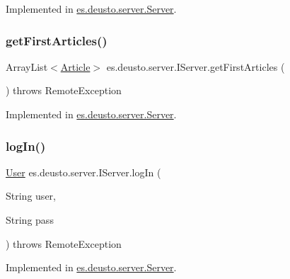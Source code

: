 Implemented in \hyperlink{classes_1_1deusto_1_1server_1_1_server_a2c4455392fb9fb404d425110b5905c6a}{es.\+deusto.\+server.\+Server}.

\mbox{\label{interfacees_1_1deusto_1_1server_1_1_i_server_a27b2a5526387404d63d7fc6d0415acd4}} 
\subsubsection{\texorpdfstring{get\+First\+Articles()}{getFirstArticles()}}
{\footnotesize\ttfamily Array\+List$<$\hyperlink{classes_1_1deusto_1_1server_1_1jdo_1_1_article}{Article}$>$ es.\+deusto.\+server.\+I\+Server.\+get\+First\+Articles (\begin{DoxyParamCaption}{ }\end{DoxyParamCaption}) throws Remote\+Exception}



Implemented in \hyperlink{classes_1_1deusto_1_1server_1_1_server_a64dfcee7821b0cc581367c1b21d9f97f}{es.\+deusto.\+server.\+Server}.

\mbox{\label{interfacees_1_1deusto_1_1server_1_1_i_server_ae6b27c8714c2e2eadc9a55bccb0543fc}} 
\subsubsection{\texorpdfstring{log\+In()}{logIn()}}
{\footnotesize\ttfamily \hyperlink{classes_1_1deusto_1_1server_1_1jdo_1_1_user}{User} es.\+deusto.\+server.\+I\+Server.\+log\+In (\begin{DoxyParamCaption}\item[{String}]{user,  }\item[{String}]{pass }\end{DoxyParamCaption}) throws Remote\+Exception}



Implemented in \hyperlink{classes_1_1deusto_1_1server_1_1_server_a5a570da0fbfec7afdf56bd3648fc904f}{es.\+deusto.\+server.\+Server}.

